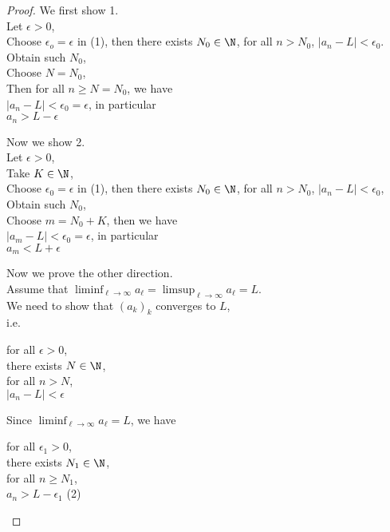 \documentclass{assignment}
\begin{document}
\begin{proof}[Proof]
        We first show 1. \\
        Let $\epsilon > 0$, \\
        Choose $\epsilon_o = \epsilon$ in (1), then there exists $N_0 \in \N$, for all $n > N_0$, $|a_n - L| < \epsilon_0$. \\
        Obtain such $N_0$, \\
        Choose $N = N_0$, \\
        Then for all $n \ge N = N_0$, we have \\
        $|a_n - L| < \epsilon_0 = \epsilon$, in particular \\
        $a_n > L - \epsilon$

        Now we show 2. \\
        Let $\epsilon > 0$, \\
        Take $K \in \N$, \\
        Choose $\epsilon_0 = \epsilon$ in (1), then there exists $N_0 \in \N$, for all $n > N_0$, $|a_n -L| < \epsilon_0$, \\
        Obtain such $N_0$, \\
        Choose $m = N_0 + K$, then we have\\
        $|a_m - L| < \epsilon_0 = \epsilon$, in particular \\
        $a_m < L + \epsilon$

        Now we prove the other direction. \\
        Assume that $\liminf_{\ell \to \infty}a_\ell = \limsup_{\ell\to\infty}a_\ell = L$. \\
        We need to show that $(a_k)_k$ converges to $L$, \\
        i.e. 
        \begin{center}
            \parbox{\linewidth}{
                \linewidth
                for all $\epsilon > 0$, \\
                \hspace*{1em}there exists $N \in \N$, \\
                \hspace*{2em}for all $n > N$, \\
                \hspace*{3em}$|a_n - L| < \epsilon$
            }
        \end{center}

        Since $\liminf_{\ell \to \infty}a_\ell = L$, we have \\
        \begin{center}
            \parbox{\linewidth}{
                \linewidth
                for all $\epsilon_1 > 0$, \\
                \hspace*{1em}there exists $N_1 \in \N$, \\
                \hspace*{2em}for all $n \ge N_1$, \\
                \hspace*{3em}$a_n > L - \epsilon_1$
                \hfill (2)
            }
        \end{center}


\end{proof}
\end{document}
